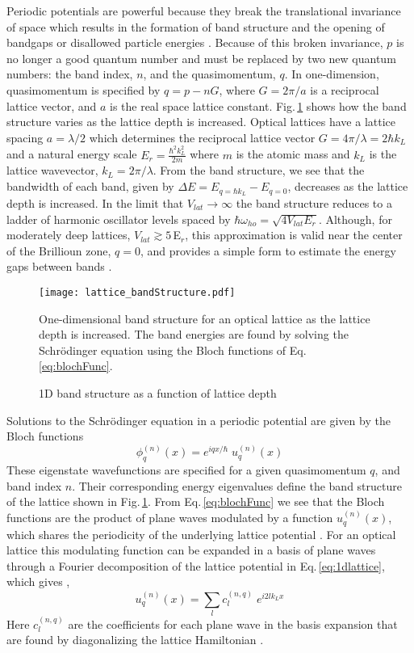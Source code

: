 Periodic potentials are powerful because they break the translational invariance of space which results in the formation of band structure and the opening of bandgaps or disallowed particle energies \cite{Ashcroft1976}.
Because of this broken invariance, $p$ is no longer a good quantum number and must be replaced by two new quantum numbers: the band index, $n$, and the quasimomentum, $q$.
In one-dimension, quasimomentum is specified by $q = p - nG$, where $G=2\pi/a$ is a reciprocal lattice vector, and $a$ is the real space lattice constant.
Fig.\,\ref{fig:bandStructure} shows how the band structure varies as the lattice depth is increased.
Optical lattices have a lattice spacing $a = \lambda /2$ which determines the reciprocal lattice vector $G = 4\pi / \lambda = 2 \hbar k_L$ and a natural energy scale $E_r = \frac{\hbar^2 k_L^2}{2m}$ where $m$ is the atomic mass and $k_L$ is the lattice wavevector, $k_L = 2\pi / \lambda$.
From the band structure, we see that the bandwidth of each band, given by $\Delta E = E_{q=\hbar k_L} - E_{q=0}$, decreases as the lattice depth is increased.
In the limit that $V_{lat}\!\rightarrow\!\infty$ the band structure reduces to a ladder of harmonic oscillator levels spaced by $\hbar \omega_{ho} = \sqrt{4 V_{lat} E_r}$.
Although, for moderately deep lattices, $V_{lat} \gtrsim 5\,$E$_r$, this approximation is valid near the center of the Brillioun zone, $q = 0$, and provides a simple form to estimate the energy gaps between bands \cite{Jaksch2005, jbc98,Jaksch2005}.
	\begin{figure} \label{fig:bandStructure}
		\centerline{
		\texttt{[image: lattice\_bandStructure.pdf]}}
		\caption{1D band structure as a function of lattice depth}{One-dimensional band structure for an optical lattice as the lattice depth is increased. The band energies are found by solving the Schr\"{o}dinger equation using the Bloch functions of Eq.\,\ref{eq:blochFunc}.}
	\end{figure}

Solutions to the Schr\"{o}dinger equation in a periodic potential are given by the Bloch functions \cite{Ashcroft1976}
	\begin{equation} \label{eq:blochFunc}
		 \phi_q^{(n)}(x) = e^{iqx/ \hbar} \; u_q^{(n)}(x)
	\end{equation}
These eigenstate wavefunctions are specified for a given quasimomentum $q$, and band index $n$. 
Their corresponding energy eigenvalues define the band structure of the lattice shown in Fig.\,\ref{fig:bandStructure}.
From Eq.\,\ref{eq:blochFunc} we see that the Bloch functions are the product of plane waves modulated by a function $u_q^{(n)}(x)$, which shares the periodicity of the underlying lattice potential \cite{Ashcroft1976}.
For an optical lattice this modulating function can be expanded in a basis of plane waves through a Fourier decomposition of the lattice potential in Eq.\,\ref{eq:1dlattice}, which gives \cite{Greiner2003},
	\begin{equation} \label{eq:blochMod}
		 u_q^{(n)}(x) = \sum_l c_l^{(n,q)} \; e^{i2lk_Lx}
	\end{equation}
Here $c_l^{(n,q)}$ are the coefficients for each plane wave in the basis expansion that are found by diagonalizing the lattice Hamiltonian \cite{Greiner2003}.

